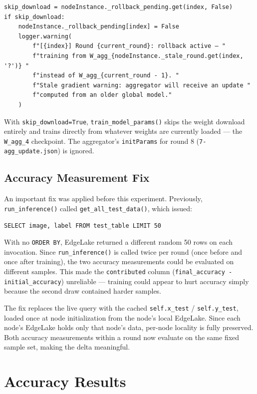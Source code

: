 \documentclass[11pt]{article}
\begin{document}
\begin{lstlisting}[style=codestyle]
skip_download = nodeInstance._rollback_pending.get(index, False)
if skip_download:
    nodeInstance._rollback_pending[index] = False
    logger.warning(
        f"[{index}] Round {current_round}: rollback active — "
        f"training from W_agg_{nodeInstance._stale_round.get(index, '?')} "
        f"instead of W_agg_{current_round - 1}. "
        f"Stale gradient warning: aggregator will receive an update "
        f"computed from an older global model."
    )
\end{lstlisting}

With \texttt{skip\_download=True}, \texttt{train\_model\_params()} skips the weight download entirely and trains directly from whatever weights are currently loaded — the \texttt{W\_agg\_4} checkpoint. The aggregator's \texttt{initParams} for round 8 (\texttt{7-agg\_update.json}) is ignored.

\subsection{Accuracy Measurement Fix}

An important fix was applied before this experiment. Previously, \texttt{run\_inference()} called \texttt{get\_all\_test\_data()}, which issued:

\begin{lstlisting}[style=logstyle]
SELECT image, label FROM test_table LIMIT 50
\end{lstlisting}

With no \texttt{ORDER BY}, EdgeLake returned a different random 50 rows on each invocation. Since \texttt{run\_inference()} is called twice per round (once before and once after training), the two accuracy measurements could be evaluated on different samples. This made the \texttt{contributed} column (\texttt{final\_accuracy - initial\_accuracy}) unreliable — training could appear to hurt accuracy simply because the second draw contained harder samples.

The fix replaces the live query with the cached \texttt{self.x\_test} / \texttt{self.y\_test}, loaded once at node initialization from the node's local EdgeLake. Since each node's EdgeLake holds only that node's data, per-node locality is fully preserved. Both accuracy measurements within a round now evaluate on the same fixed sample set, making the delta meaningful.

\section{Accuracy Results}
\end{document}
